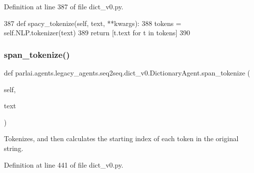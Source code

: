 Definition at line 387 of file dict\+\_\+v0.\+py.


\begin{DoxyCode}
387     \textcolor{keyword}{def }spacy\_tokenize(self, text, **kwargs):
388         tokens = self.NLP.tokenizer(text)
389         \textcolor{keywordflow}{return} [t.text \textcolor{keywordflow}{for} t \textcolor{keywordflow}{in} tokens]
390 
\end{DoxyCode}
\mbox{\label{classparlai_1_1agents_1_1legacy__agents_1_1seq2seq_1_1dict__v0_1_1DictionaryAgent_acb9c4128aa95e0a6dcd787c33395c877}} 
\subsubsection{\texorpdfstring{span\+\_\+tokenize()}{span\_tokenize()}}
{\footnotesize\ttfamily def parlai.\+agents.\+legacy\+\_\+agents.\+seq2seq.\+dict\+\_\+v0.\+Dictionary\+Agent.\+span\+\_\+tokenize (\begin{DoxyParamCaption}\item[{}]{self,  }\item[{}]{text }\end{DoxyParamCaption})}

\begin{DoxyVerb}Tokenizes, and then calculates the starting index of each token in the original
string.
\end{DoxyVerb}
 

Definition at line 441 of file dict\+\_\+v0.\+py.


